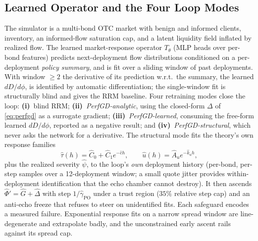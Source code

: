 \documentclass[sigconf]{acmart}
\newcommand{\gPO}{\gamma_{\mathrm{PO}}}
\begin{document}
\subsection{Learned Operator and the Four Loop Modes}
The simulator is a multi-bond OTC market with benign and informed clients,
inventory, an informed-flow saturation cap, and a latent liquidity field
inflated by realized flow. The learned market-response operator $T_\theta$
(MLP heads over per-bond features) predicts next-deployment flow
distributions conditioned on a per-deployment \emph{policy summary}, and is
fit over a sliding window of past deployments. With window $\ge2$ the
derivative of its prediction w.r.t.\ the summary, the learned $dD/d\phi$, is
identified by automatic differentiation; the single-window fit is
structurally blind and gives the RRM baseline. Four retraining modes close
the loop: \textbf{(i)}~blind RRM; \textbf{(ii)}~\emph{PerfGD-analytic},
using the closed-form $\Delta$ of \eqref{eq:perfgd} as a surrogate gradient;
\textbf{(iii)}~\emph{PerfGD-learned}, consuming the free-form learned
$dD/d\phi$, reported as a negative result; and
\textbf{(iv)}~\emph{PerfGD-structural}, which never asks the network for a
derivative. The structural mode fits the theory's own response families
\begin{equation}
\hat\tau(h)=\hat C_0+\hat C_1 e^{-\hat c h},\qquad
\hat u(h)=\hat A_u e^{-\hat k_u h},
\label{eq:structfit}
\end{equation}
plus the realized severity $\hat\psi$, to the loop's \emph{own} deployment
history (per-bond, per-step samples over a 12-deployment window; a small
quote jitter provides within-deployment identification that the echo chamber
cannot destroy). It then ascends $\hat\Phi'=\hat G+\hat\Delta$ with step
$1/\hat\gPO$ under a trust region ($35\%$ relative step cap) and an
anti-echo freeze that refuses to steer on unidentified fits. Each safeguard
encodes a measured failure. Exponential response fits on a narrow spread
window are line-degenerate and extrapolate badly, and the unconstrained
early ascent rails against its spread cap.
\end{document}
